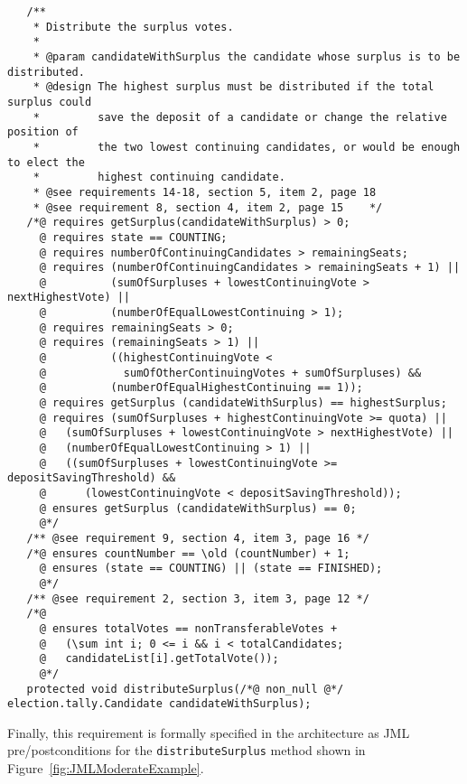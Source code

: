 \documentclass[letterpaper,twocolumn,10pt]{article}
\begin{document}
 \begin{figure*}[t]
 {\footnotesize
 \begin{verbatim}
   /** 
    * Distribute the surplus votes.
    * 
    * @param candidateWithSurplus the candidate whose surplus is to be distributed.
    * @design The highest surplus must be distributed if the total surplus could 
    *         save the deposit of a candidate or change the relative position of
    *         the two lowest continuing candidates, or would be enough to elect the
    *         highest continuing candidate.
    * @see requirements 14-18, section 5, item 2, page 18
    * @see requirement 8, section 4, item 2, page 15    */
   /*@ requires getSurplus(candidateWithSurplus) > 0;
     @ requires state == COUNTING;
     @ requires numberOfContinuingCandidates > remainingSeats;
     @ requires (numberOfContinuingCandidates > remainingSeats + 1) ||
     @          (sumOfSurpluses + lowestContinuingVote > nextHighestVote) ||
     @          (numberOfEqualLowestContinuing > 1);
     @ requires remainingSeats > 0;
     @ requires (remainingSeats > 1) ||
     @          ((highestContinuingVote < 
     @            sumOfOtherContinuingVotes + sumOfSurpluses) &&
     @          (numberOfEqualHighestContinuing == 1));
     @ requires getSurplus (candidateWithSurplus) == highestSurplus;
     @ requires (sumOfSurpluses + highestContinuingVote >= quota) ||
     @   (sumOfSurpluses + lowestContinuingVote > nextHighestVote) ||
     @   (numberOfEqualLowestContinuing > 1) ||
     @   ((sumOfSurpluses + lowestContinuingVote >= depositSavingThreshold) &&
     @      (lowestContinuingVote < depositSavingThreshold));
     @ ensures getSurplus (candidateWithSurplus) == 0;
     @*/
   /** @see requirement 9, section 4, item 3, page 16 */
   /*@ ensures countNumber == \old (countNumber) + 1;
     @ ensures (state == COUNTING) || (state == FINISHED);
     @*/
   /** @see requirement 2, section 3, item 3, page 12 */
   /*@
     @ ensures totalVotes == nonTransferableVotes + 
     @   (\sum int i; 0 <= i && i < totalCandidates; 
     @   candidateList[i].getTotalVote());
     @*/
   protected void distributeSurplus(/*@ non_null @*/ election.tally.Candidate candidateWithSurplus);
 \end{verbatim}
 }
 \caption{JML Specification of the \texttt{distributeSurplus} method.}
 \label{fig:JMLModerateExample}
 \end{figure*}                           
 
 Finally, this requirement is formally specified in the
 architecture as JML pre/postconditions for the \texttt{distributeSurplus}
 method shown in Figure~\ref{fig:JMLModerateExample}.
 
\end{document}

